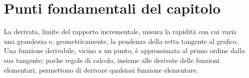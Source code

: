 \section{Punti fondamentali del capitolo}
\label{sec:sintesi-cap05}

La derivata, limite del rapporto incrementale, misura la rapidità con cui varia una
grandezza e, geometricamente, la pendenza della retta tangente al grafico. Una funzione
derivabile, vicino a un punto, è approssimata al primo ordine dalla sua tangente; poche
regole di calcolo, insieme alle derivate delle funzioni elementari, permettono di
derivare qualsiasi funzione elementare.

